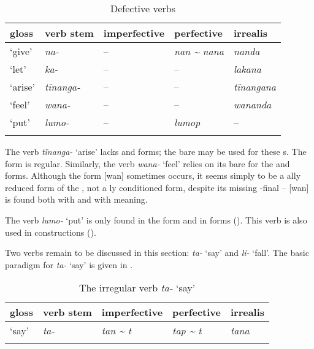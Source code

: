 \begin{table}
\caption{Defective verbs}
\label{tab:4.8}
\begin{tabularx}{\textwidth}{QQQQQ}
\lsptoprule
gloss & verb stem & imperfective & perfective & irrealis\\
\midrule
‘give’ & {\itshape na-} & -- & {\itshape nan {\textasciitilde} nana} & {\itshape nanda}\\
‘let’ & {\itshape ka-} & -- & -- & {\itshape lakana}\\
‘arise’ & {\itshape tïnanga-} & -- & -- & {\itshape tïnangana}\\
‘feel’ & {\itshape wana-} & -- & -- & {\itshape wananda}\\
‘put’ & {\itshape lumo-} & -- & {\itshape lumop} & --\\
\lspbottomrule
\end{tabularx}
\end{table}
The verb \textit{tïnanga-} ‘arise’ lacks  and  forms; the bare  may be used for these s. The  form is regular. Similarly, the verb \textit{wana-} ‘feel’ relies on its bare  for the  and  forms. Although the form [wan] sometimes occurs, it seems simply to be a ally reduced form of the , not a ly conditioned  form, despite its missing -final  -- [wan] is found both with  and with  meaning.

  The verb \textit{lumo-} ‘put’ is only found in the  form and in  forms (). This verb is also used in  constructions ().

  Two verbs remain to be discussed in this section: \textit{ta-} ‘say’ and \textit{li-} ‘fall’. The basic paradigm for \textit{ta-} ‘say’ is given in .


\begin{table}
\caption{The irregular verb \textit{ta-} ‘say’}
\label{tab:4.9}
\begin{tabularx}{\textwidth}{QQQQQ}
\lsptoprule
gloss & verb stem & imperfective & perfective & irrealis\\
\midrule
‘say’ & {\itshape ta-} & {\itshape tan {\textasciitilde} t} & {\itshape tap {\textasciitilde} t} & {\itshape tana}\\
\lspbottomrule
\end{tabularx}
\end{table}


